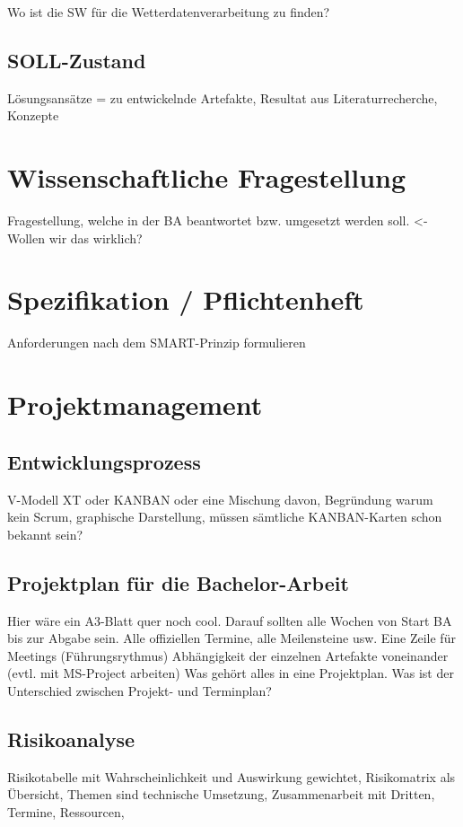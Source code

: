 \documentclass[a4paper,ngerman, 12pt]{report}
\begin{document}
Wo ist die SW für die Wetterdatenverarbeitung zu finden?

\section{SOLL-Zustand}
Lösungsansätze = zu entwickelnde Artefakte, 
Resultat aus Literaturrecherche, 
Konzepte


\chapter{Wissenschaftliche Fragestellung}

Fragestellung, welche in der BA beantwortet bzw. umgesetzt werden soll. <- Wollen wir das wirklich?


\chapter{Spezifikation / Pflichtenheft}
Anforderungen nach dem SMART-Prinzip formulieren
   


\chapter{Projektmanagement}
\section{Entwicklungsprozess}
V-Modell XT oder KANBAN oder eine Mischung davon, Begründung warum kein Scrum, graphische Darstellung, müssen sämtliche KANBAN-Karten schon bekannt sein?


\section{Projektplan für die Bachelor-Arbeit}
Hier wäre ein A3-Blatt quer noch cool. Darauf sollten alle Wochen von Start BA bis zur Abgabe sein.
Alle offiziellen Termine, alle Meilensteine usw.
Eine Zeile für Meetings (Führungsrythmus)
Abhängigkeit der einzelnen Artefakte voneinander (evtl. mit MS-Project arbeiten)
Was gehört alles in eine Projektplan. Was ist der Unterschied zwischen Projekt- und Terminplan?

\section{Risikoanalyse}
   
Risikotabelle mit Wahrscheinlichkeit und Auswirkung gewichtet, Risikomatrix als Übersicht, Themen sind technische Umsetzung, Zusammenarbeit mit Dritten, Termine, Ressourcen, 
\end{document}
